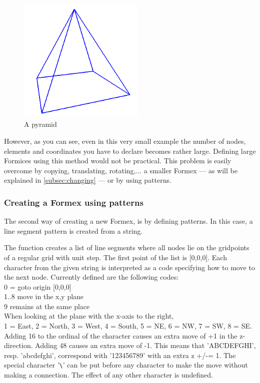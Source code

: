 \begin{figure}[ht]
  \centering
  \begin{makeimage}
  \end{makeimage}
  \begin{latexonly}
    \includegraphics[width=6cm]{images/pyramide}
  \end{latexonly}
  \begin{htmlonly}
  \end{htmlonly}  
  \caption{A pyramid}
  \label{fig:pyramid}
\end{figure}

However, as you can see, even in this very small example the number of nodes, elements and coordinates you have to declare becomes rather large. Defining large Formices using this method would not be practical. This problem is easily overcome by copying, translating, rotating,... a smaller Formex --- as will be explained in \ref{subsec:changing} --- or by using patterns.
 
\subsubsection{Creating a Formex using patterns}

The second way of creating a new Formex, is by defining patterns. In this case, a line segment pattern is created from a string.

The function  creates a list of line segments where all nodes lie on the
gridpoints of a regular grid with unit step.
The first point of the list is [0,0,0]. Each character from the given
string  is interpreted as a code specifying how to move to the next node.
Currently defined are the following codes:\\
    0 = goto origin [0,0,0]\\
    1..8 move in the x,y plane\\
    9 remains at the same place\\
    When looking at the plane with the x-axis to the right,\\
    1 = East, 2 = North, 3 = West, 4 = South, 5 = NE, 6 = NW, 7 = SW, 8 = SE.\\
    Adding 16 to the ordinal of the character causes an extra move of +1 in
    the z-direction. Adding 48 causes an extra move of -1. This means that
    'ABCDEFGHI', resp. 'abcdefghi', correspond with '123456789' with an extra
    z +/-= 1.              
    The special character '\verb?\?' can be put before any character to make the
    move without making a connection.
    The effect of any other character is undefined.

